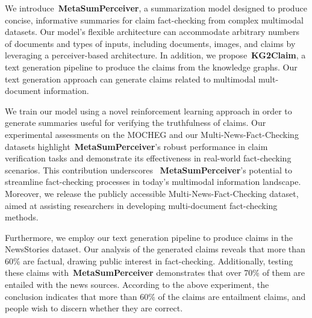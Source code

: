 We introduce~\textbf{MetaSumPerceiver}, a summarization model designed to produce concise, informative summaries for claim fact-checking from complex multimodal datasets. Our model's flexible architecture can accommodate arbitrary numbers of documents and types of inputs, including documents, images, and claims by leveraging a perceiver-based architecture. In addition, we propose~\textbf{KG2Claim}, a text generation pipeline to produce the claims from the knowledge graphs. Our text generation approach can generate claims related to multimodal mult-document information.

We train our model using a novel reinforcement learning approach in order to generate summaries useful for verifying the truthfulness of claims. Our experimental assessments on the MOCHEG and our Multi-News-Fact-Checking datasets highlight~\textbf{MetaSumPerceiver}'s robust performance in claim verification tasks and demonstrate its effectiveness in real-world fact-checking scenarios. This contribution underscores ~\textbf{MetaSumPerceiver}'s potential to streamline fact-checking processes in today's multimodal information landscape. Moreover, we release the publicly accessible Multi-News-Fact-Checking dataset, aimed at assisting researchers in developing multi-document fact-checking methods.

Furthermore, we employ our text generation pipeline to produce claims in the NewsStories dataset. Our analysis of the generated claims reveals that more than 60\% are factual, drawing public interest in fact-checking. Additionally, testing these claims with~\textbf{MetaSumPerceiver} demonstrates that over 70\% of them are entailed with the news sources. According to the above experiment, the conclusion indicates that more than 60\% of the claims are entailment claims, and people wish to discern whether they are correct.